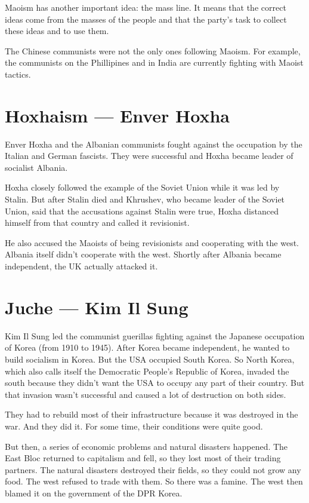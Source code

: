 \documentclass[a4paper]{book}%
\begin{document}
Maoism has another important idea: the mass line. It means that the correct ideas come from the masses of the people and that the party's task to collect these ideas and to use them.

The Chinese communists were not the only ones following Maoism. For example, the communists on the Phillipines and in India are currently fighting with Maoist tactics.

\section{Hoxhaism --- Enver Hoxha}

Enver Hoxha and the Albanian communists fought against the occupation by the Italian and German fascists. They were successful and Hoxha became leader of socialist Albania.

Hoxha closely followed the example of the Soviet Union while it was led by Stalin. But after Stalin died and Khrushev, who became leader of the Soviet Union, said that the accusations against Stalin were true, Hoxha distanced himself from that country and called it revisionist.

He also accused the Maoists of being revisionists and cooperating with the west. Albania itself didn't cooperate with the west. Shortly after Albania became independent, the UK actually attacked it.

\section{Juche --- Kim Il Sung}

Kim Il Sung led the communist guerillas fighting against the Japanese occupation of Korea (from 1910 to 1945). After Korea became independent, he wanted to build socialism in Korea. But the USA occupied South Korea. So North Korea, which also calls itself the Democratic People's Republic of Korea, invaded the south because they didn't want the USA to occupy any part of their country. But that invasion wasn't successful and caused a lot of destruction on both sides.

They had to rebuild most of their infrastructure because it was destroyed in the war. And they did it. For some time, their conditions were quite good.

But then, a series of economic problems and natural disasters happened. The East Bloc returned to capitalism and fell, so they lost most of their trading partners. The natural disasters destroyed their fields, so they could not grow any food. The west refused to trade with them. So there was a famine. The west then blamed it on the government of the DPR Korea.
\end{document}

